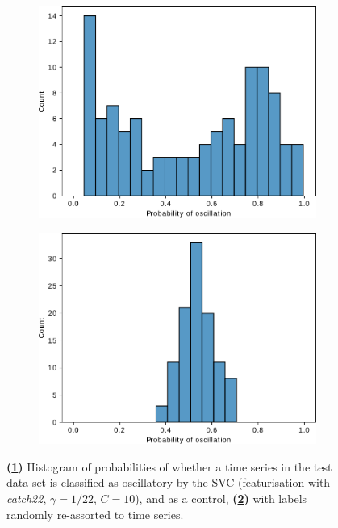 \begin{figure}
  \centering
  \begin{subfigure}[htpb]{0.5\textwidth}
   \centering
   \includegraphics[width=\textwidth]{svm_2_edit.pdf}
   \caption{
   }
   \label{fig:analysis-svc-proba-histogram-model}
  \end{subfigure}%
  \begin{subfigure}[htpb]{0.5\textwidth}
   \centering
   \includegraphics[width=\textwidth]{svm_scramble_2_edit.pdf}
   \caption{
   }
   \label{fig:analysis-svc-proba-histogram-scramble}
  \end{subfigure}

  \caption{
    \textbf{(\ref{fig:analysis-svc-proba-histogram-model})}
    Histogram of probabilities of whether a time series in the test data set is classified as oscillatory by the SVC (featurisation with \textit{catch22}, $\gamma = 1/22$, $C = 10$), and as a control,
    \textbf{(\ref{fig:analysis-svc-proba-histogram-scramble})}
    with labels randomly re-assorted to time series.
  }
  \label{fig:analysis-svc-proba-histogram}
\end{figure}


